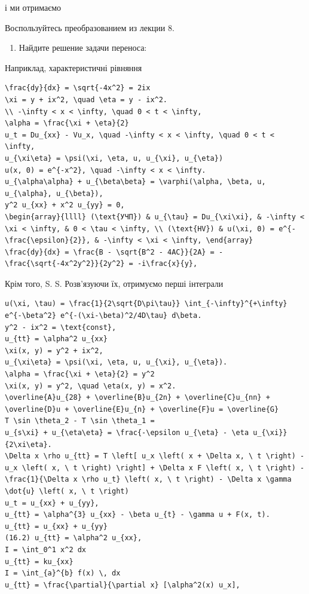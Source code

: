 \documentclass[
  ukrainian,
]{article}
\providecommand{\tightlist}{%
  \setlength{\itemsep}{0pt}\setlength{\parskip}{0pt}}
\begin{document}
і ми отримаємо

Воспользуйтесь преобразованием из лекции 8.

\begin{enumerate}
\def\labelenumi{\arabic{enumi}.}
\setcounter{enumi}{2}
\tightlist
\item
  Найдите решение задачи переноса:
\end{enumerate}

Наприклад, характеристичні рівняння

\begin{verbatim}
\frac{dy}{dx} = \sqrt{-4x^2} = 2ix
\xi = y + ix^2, \quad \eta = y - ix^2.
\\ -\infty < x < \infty, \quad 0 < t < \infty,
\alpha = \frac{\xi + \eta}{2}
u_t = Du_{xx} - Vu_x, \quad -\infty < x < \infty, \quad 0 < t < \infty,
u_{\xi\eta} = \psi(\xi, \eta, u, u_{\xi}, u_{\eta})
u(x, 0) = e^{-x^2}, \quad -\infty < x < \infty.
u_{\alpha\alpha} + u_{\beta\beta} = \varphi(\alpha, \beta, u, u_{\alpha}, u_{\beta}),
y^2 u_{xx} + x^2 u_{yy} = 0,
\begin{array}{llll} (\text{УЧП}) & u_{\tau} = Du_{\xi\xi}, & -\infty < \xi < \infty, & 0 < \tau < \infty, \\ (\text{HV}) & u(\xi, 0) = e^{-\frac{\epsilon}{2}}, & -\infty < \xi < \infty, \end{array}
\frac{dy}{dx} = \frac{B - \sqrt{B^2 - 4AC}}{2A} = -\frac{\sqrt{-4x^2y^2}}{2y^2} = -i\frac{x}{y},
\end{verbatim}

Крім того, S. S. Розв'язуючи їх, отримуємо перші інтеграли

\begin{verbatim}
u(\xi, \tau) = \frac{1}{2\sqrt{D\pi\tau}} \int_{-\infty}^{+\infty} e^{-\beta^2} e^{-(\xi-\beta)^2/4D\tau} d\beta.
y^2 - ix^2 = \text{const},
u_{tt} = \alpha^2 u_{xx}
\xi(x, y) = y^2 + ix^2,
u_{\xi\eta} = \psi(\xi, \eta, u, u_{\xi}, u_{\eta}).
\alpha = \frac{\xi + \eta}{2} = y^2
\xi(x, y) = y^2, \quad \eta(x, y) = x^2.
\overline{A}u_{28} + \overline{B}u_{2n} + \overline{C}u_{nn} + \overline{D}u + \overline{E}u_{n} + \overline{F}u = \overline{G}
T \sin \theta_2 - T \sin \theta_1 =
u_{s\xi} + u_{\eta\eta} = \frac{-\epsilon u_{\eta} - \eta u_{\xi}}{2\xi\eta}.
\Delta x \rho u_{tt} = T \left[ u_x \left( x + \Delta x, \ t \right) - u_x \left( x, \ t \right) \right] + \Delta x F \left( x, \ t \right) - \frac{1}{\Delta x \rho u_t} \left( x, \ t \right) - \Delta x \gamma \dot{u} \left( x, \ t \right)
u_t = u_{xx} + u_{yy},
u_{tt} = \alpha^{3} u_{xx} - \beta u_{t} - \gamma u + F(x, t).
u_{tt} = u_{xx} + u_{yy}
(16.2) u_{tt} = \alpha^2 u_{xx},
I = \int_0^1 x^2 dx
u_{tt} = ku_{xx}
I = \int_{a}^{b} f(x) \, dx
u_{tt} = \frac{\partial}{\partial x} [\alpha^2(x) u_x],
\end{verbatim}
\end{document}
